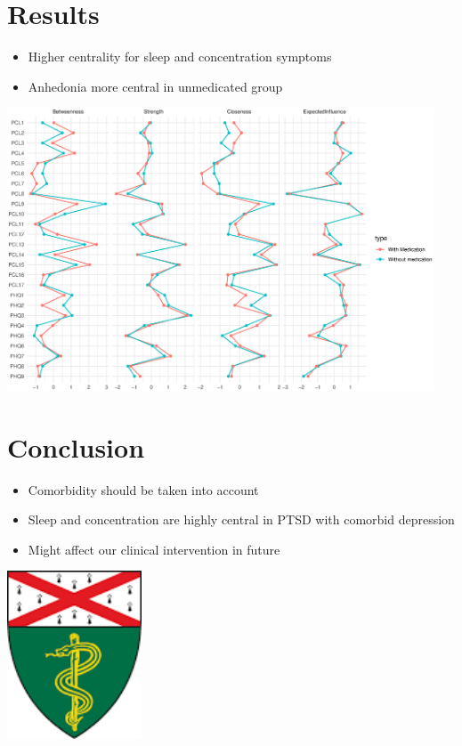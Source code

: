 \documentclass[]{betterposter}
\begin{document}
{\section{Results}
\begin{itemize}
    \item Higher centrality for sleep and concentration symptoms
    \item Anhedonia more central in unmedicated group
\end{itemize}

\begin{center}
    \includegraphics[width=0.95\textwidth]{img/centrality_medUnmed.eps}
\end{center}

\section{Conclusion}
\begin{itemize}
    \item Comorbidity should be taken into account
    \item Sleep and concentration are highly central in PTSD with comorbid depression
    \item Might affect our clinical intervention in future
\end{itemize}

\vfill

\begin{center}


\includegraphics[width=0.3\textwidth]{img/yalesm.png}\\
\end{center}
}{

}
\end{document}

